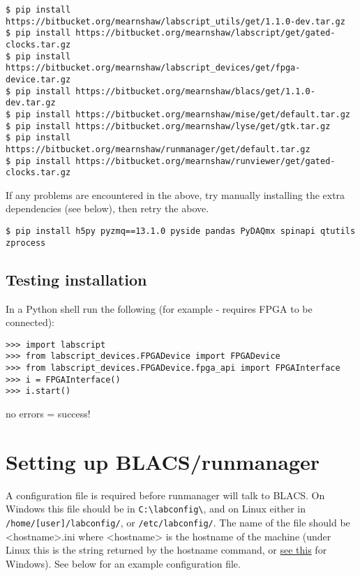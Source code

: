 \documentclass[11pt,a4paper]{article}
\begin{document}
\begin{verbatim}
$ pip install https://bitbucket.org/mearnshaw/labscript_utils/get/1.1.0-dev.tar.gz
$ pip install https://bitbucket.org/mearnshaw/labscript/get/gated-clocks.tar.gz
$ pip install https://bitbucket.org/mearnshaw/labscript_devices/get/fpga-device.tar.gz
$ pip install https://bitbucket.org/mearnshaw/blacs/get/1.1.0-dev.tar.gz
$ pip install https://bitbucket.org/mearnshaw/mise/get/default.tar.gz
$ pip install https://bitbucket.org/mearnshaw/lyse/get/gtk.tar.gz
$ pip install https://bitbucket.org/mearnshaw/runmanager/get/default.tar.gz
$ pip install https://bitbucket.org/mearnshaw/runviewer/get/gated-clocks.tar.gz
\end{verbatim}

If any problems are encountered in the above, try manually installing the extra dependencies (see below), then retry the above.

\begin{verbatim}
$ pip install h5py pyzmq==13.1.0 pyside pandas PyDAQmx spinapi qtutils zprocess
\end{verbatim}

\subsection{Testing installation}
In a Python shell run the following (for example - requires FPGA to be connected):

\begin{verbatim}
>>> import labscript
>>> from labscript_devices.FPGADevice import FPGADevice
>>> from labscript_devices.FPGADevice.fpga_api import FPGAInterface
>>> i = FPGAInterface()
>>> i.start()
\end{verbatim}

no errors = success!

\section{Setting up BLACS/runmanager}
A configuration file is required before runmanager will talk to BLACS. On Windows this file should be in \texttt{C:\textbackslash{}labconfig\textbackslash{}}, and on Linux either in \texttt{/home/[user]/labconfig/}, or \texttt{/etc/labconfig/}. The name of the file should be \textless{}hostname\textgreater{}.ini where \textless{}hostname\textgreater{} is the hostname of the machine (under Linux this is the string returned by the hostname command, or \href{http://windows.microsoft.com/en-gb/windows/find-computer-name}{see this} for Windows). See below for an example configuration file.
\end{document}
